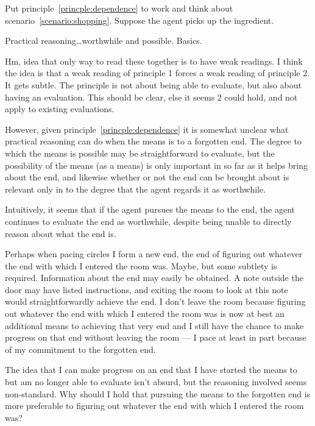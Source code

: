 \documentclass[10pt]{article}
\begin{document}
\newpage

Put principle~\ref{princple:dependence} to work and think about scenario~\ref{scenario:shopping}.
Suppose the agent picks up the ingredient.

Practical reasoning\dots worthwhile and possible.
Basics.



Hm, idea that only way to read these together is to have weak readings.
I think the idea is that a weak reading of principle 1 forces a weak reading of principle 2.
It gets subtle.
The principle is not about being able to evaluate, but also about having an evaluation.
This should be clear, else it seems 2 could hold, and not apply to existing evaluations.




\newpage

However, given principle~\ref{princple:dependence} it is somewhat unclear what practical reasoning can do when the means is to a forgotten end.
The degree to which the means is possible may be straightforward to evaluate, but the possibility of the means (as a means) is only important in so far as it helps bring about the end, and likewise whether or not the end can be brought about is relevant only in to the degree that the agent regards it as worthwhile.

Intuitively, it seems that if the agent pursues the means to the end, the agent continues to evaluate the end as worthwhile, despite being unable to directly reason about what the end is.

Perhaps when pacing circles I form a new end, the end of figuring out whatever the end with which I entered the room was.
Maybe, but some subtlety is required.
Information about the end may easily be obtained.
A note outside the door may have listed instructions, and exiting the room to look at this note would straightforwardly achieve the end.
I don't leave the room because figuring out whatever the end with which I entered the room was is now at best an additional means to achieving that very end and I still have the chance to make progress on that end without leaving the room --- I pace at least in part because of my commitment to the forgotten end.

The idea that I can make progress on an end that I have started the means to but am no longer able to evaluate isn't absurd, but the reasoning involved seems non-standard.
Why should I hold that pursuing the means to the forgotten end is more preferable to figuring out whatever the end with which I entered the room was?
\end{document}
